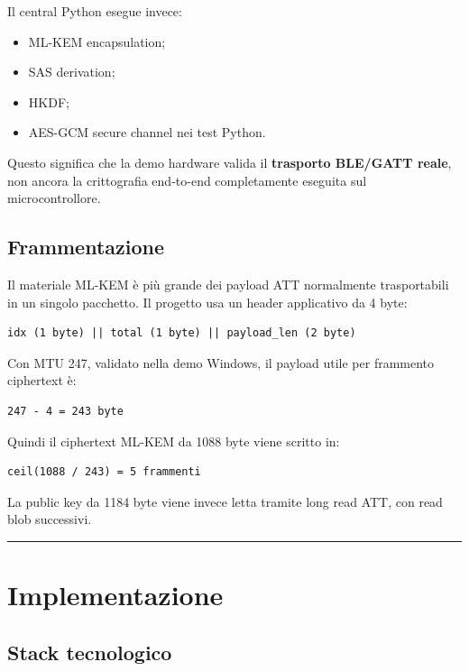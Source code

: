 \documentclass[11pt,a4paper]{article}
\providecommand{\tightlist}{\setlength{\itemsep}{0pt}\setlength{\parskip}{0pt}}
\begin{document}
Il central Python esegue invece:

\begin{itemize}
\tightlist
\item
  ML-KEM encapsulation;
\item
  SAS derivation;
\item
  HKDF;
\item
  AES-GCM secure channel nei test Python.
\end{itemize}

Questo significa che la demo hardware valida il \textbf{trasporto
BLE/GATT reale}, non ancora la crittografia end-to-end completamente
eseguita sul microcontrollore.

\subsection{Frammentazione}\label{frammentazione}

Il materiale ML-KEM è più grande dei payload ATT normalmente
trasportabili in un singolo pacchetto. Il progetto usa un header
applicativo da 4 byte:

\begin{lstlisting}
idx (1 byte) || total (1 byte) || payload_len (2 byte)
\end{lstlisting}

Con MTU 247, validato nella demo Windows, il payload utile per frammento
ciphertext è:

\begin{lstlisting}
247 - 4 = 243 byte
\end{lstlisting}

Quindi il ciphertext ML-KEM da 1088 byte viene scritto in:

\begin{lstlisting}
ceil(1088 / 243) = 5 frammenti
\end{lstlisting}

La public key da 1184 byte viene invece letta tramite long read ATT, con
read blob successivi.

\begin{center}\rule{0.5\linewidth}{0.5pt}\end{center}

\section{Implementazione}\label{capitolo-5---implementazione}

\subsection{Stack tecnologico}\label{stack-tecnologico}
\end{document}
